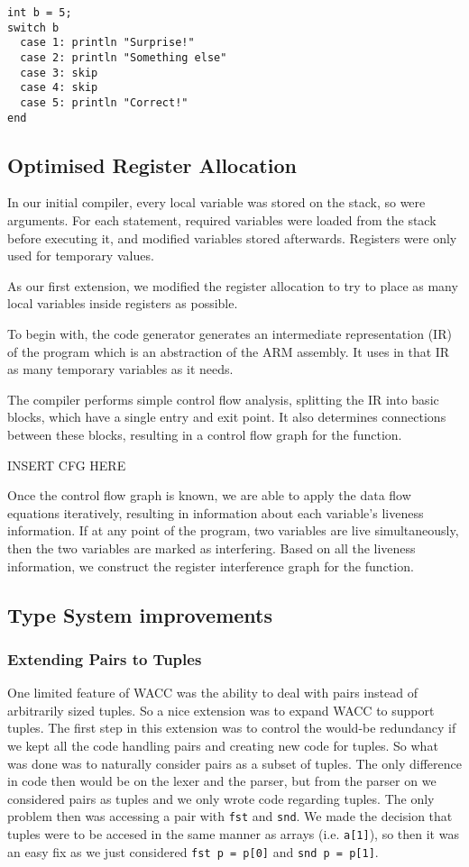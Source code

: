 \documentclass{article}
\begin{document}
\begin{lstlisting}
int b = 5;
switch b
  case 1: println "Surprise!"
  case 2: println "Something else"
  case 3: skip
  case 4: skip
  case 5: println "Correct!"
end

\end{lstlisting}


\subsection{Optimised Register Allocation}
In our initial compiler, every local variable was stored on the stack, so were arguments. For each statement, required variables were loaded
from the stack before executing it, and modified variables stored afterwards. Registers were only used for temporary values.

As our first extension, we modified the register allocation to try to place as many local variables inside registers as possible.

To begin with, the code generator generates an intermediate representation (IR) of the program which is an abstraction of the ARM assembly.
It uses in that IR as many temporary variables as it needs.

The compiler performs simple control flow analysis, splitting the IR into basic blocks, which have a single entry and exit point. It
also determines connections between these blocks, resulting in a control flow graph for the function.

INSERT CFG HERE

Once the control flow graph is known, we are able to apply the data flow equations iteratively, resulting in information about each
variable's liveness information. If at any point of the program, two variables are live simultaneously, then the two variables are marked
as interfering. Based on all the liveness information, we construct the register interference graph for the function.

\subsection{Type System improvements}
\subsubsection{Extending Pairs to Tuples}
One limited feature of WACC was the ability to deal with pairs instead of arbitrarily sized tuples. So a nice extension was to expand WACC to support tuples. The first step in this extension was to control the would-be redundancy if we kept all the code handling pairs and creating new code for tuples. So what was done was to naturally consider pairs as a subset of tuples. The only difference in code then would be on the lexer and the parser, but from the parser on we considered pairs as tuples and we only wrote code regarding tuples. The only problem then was accessing a pair with \texttt{fst} and \texttt{snd}. We made the decision that tuples were to be accesed in the same manner as arrays (i.e. \texttt{a[1]}), so then it  was an easy fix as we just considered \texttt{fst p = p[0]} and \texttt{snd p = p[1]}.
\end{document}
